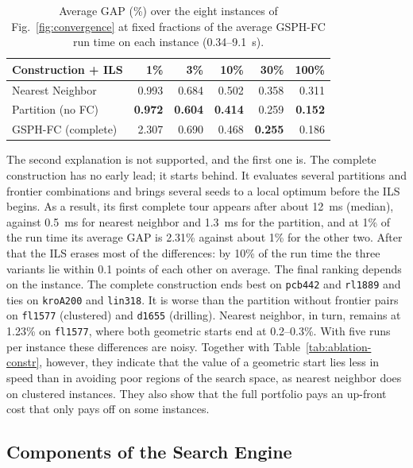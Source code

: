 \documentclass[runningheads]{llncs}
\begin{document}
\begin{table}
\caption{Average GAP (\%) over the eight instances of
Fig.~\ref{fig:convergence} at fixed fractions of the average GSPH-FC
run time on each instance (0.34--9.1~s).}
\label{tab:convergence}
\centering\scriptsize
\begin{tabular}{@{}lrrrrr@{}}
\toprule
\textbf{Construction + ILS} & \textbf{1\%} & \textbf{3\%} & \textbf{10\%} & \textbf{30\%} & \textbf{100\%}\\
\midrule
Nearest Neighbor        & 0.993 & 0.684 & 0.502 & 0.358 & 0.311 \\
Partition (no FC)       & \textbf{0.972} & \textbf{0.604} & \textbf{0.414} & 0.259 & \textbf{0.152} \\
GSPH-FC (complete)      & 2.307 & 0.690 & 0.468 & \textbf{0.255} & 0.186 \\
\bottomrule
\end{tabular}
\end{table}

The second explanation is not supported, and the first one is. The
complete construction has no early lead; it starts behind. It evaluates
several partitions and frontier combinations and brings several seeds
to a local optimum before the ILS begins. As a result, its first
complete tour appears after about 12~ms (median), against 0.5~ms for
nearest neighbor and 1.3~ms for the partition, and at 1\% of the run
time its average GAP is 2.31\% against about 1\% for the other two.
After that the ILS erases most of the differences: by 10\% of the run
time the three variants lie within 0.1 points of each other on average.
The final ranking depends on the instance. The complete construction
ends best on \texttt{pcb442} and \texttt{rl1889} and ties on
\texttt{kroA200} and \texttt{lin318}. It is worse than the partition
without frontier pairs on \texttt{fl1577} (clustered) and \texttt{d1655}
(drilling). Nearest neighbor, in turn, remains at 1.23\% on
\texttt{fl1577}, where both geometric starts end at 0.2--0.3\%. With five
runs per instance these differences are noisy. Together with
Table~\ref{tab:ablation-constr}, however, they indicate that the value
of a geometric start lies less in speed than in avoiding poor regions of
the search space, as nearest neighbor does on clustered instances. They
also show that the full portfolio pays an up-front cost that only pays
off on some instances.

\subsection{Components of the Search Engine}
\label{sec:engine-ablation}
\end{document}
